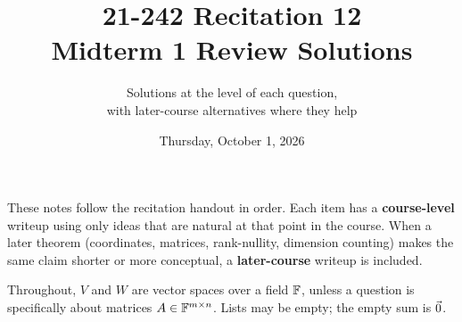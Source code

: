 \documentclass[11pt]{article}
\title{\textbf{21-242 Recitation 12}\\Midterm 1 Review Solutions}
\author{Solutions at the level of each question,\\with later-course alternatives where they help}
\date{Thursday, October 1, 2026}
\begin{document}
\maketitle
\tableofcontents
\newpage

\noindent
These notes follow the recitation handout in order. Each item has a
\textbf{course-level} writeup using only ideas that are natural at that point
in the course. When a later theorem (coordinates, matrices, rank-nullity,
dimension counting) makes the same claim shorter or more conceptual, a
\textbf{later-course} writeup is included.

Throughout, $V$ and $W$ are vector spaces over a field $\mathbb{F}$, unless a question
is specifically about matrices $A\in\mathbb{F}^{m\times n}$. Lists may be empty; the
empty sum is $\vec{0}$.










\end{document}
